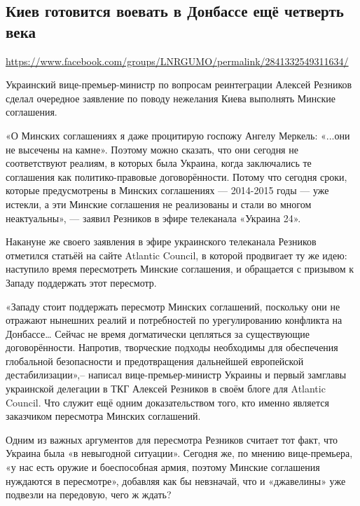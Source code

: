  
 

\subsection{Киев готовится воевать в Донбассе ещё четверть века}
\label{sec:13_07_2020.fb.lnr.2}
\url{https://www.facebook.com/groups/LNRGUMO/permalink/2841332549311634/}
  
Украинский вице-премьер-министр по вопросам реинтеграции Алексей Резников
сделал очередное заявление по поводу нежелания Киева выполнять Минские
соглашения.

«О Минских соглашениях я даже процитирую госпожу Ангелу Меркель: «...они не
высечены на камне». Поэтому можно сказать, что они сегодня не соответствуют
реалиям, в которых была Украина, когда заключались те соглашения как
политико-правовые договорённости. Потому что сегодня сроки, которые
предусмотрены в Минских соглашениях --- 2014-2015 годы --- уже истекли, а эти
Минские соглашения не реализованы и стали во многом неактуальны», --- заявил
Резников в эфире телеканала «Украина 24».

Накануне же своего заявления в эфире украинского телеканала Резников отметился
статьёй на сайте Atlantic Council, в которой продвигает ту же идею: наступило
время пересмотреть Минские соглашения, и обращается с призывом к Западу
поддержать этот пересмотр.

«Западу стоит поддержать пересмотр Минских соглашений, поскольку они не
отражают нынешних реалий и потребностей по урегулированию конфликта на
Донбассе… Сейчас не время догматически цепляться за существующие
договорённости. Напротив, творческие подходы необходимы для обеспечения
глобальной безопасности и предотвращения дальнейшей европейской
дестабилизации»,– написал вице-премьер-министр Украины и первый замглавы
украинской делегации в ТКГ Алексей Резников в своём блоге для Atlantic Council.
Что служит ещё одним доказательством того, кто именно является заказчиком
пересмотра Минских соглашений.

Одним из важных аргументов для пересмотра Резников считает тот факт, что
Украина была «в невыгодной ситуации». Сегодня же, по мнению вице-премьера, «у
нас есть оружие и боеспособная армия, поэтому Минские соглашения нуждаются в
пересмотре», добавляя как бы невзначай, что и «джавелины» уже подвезли на
передовую, чего ж ждать?

